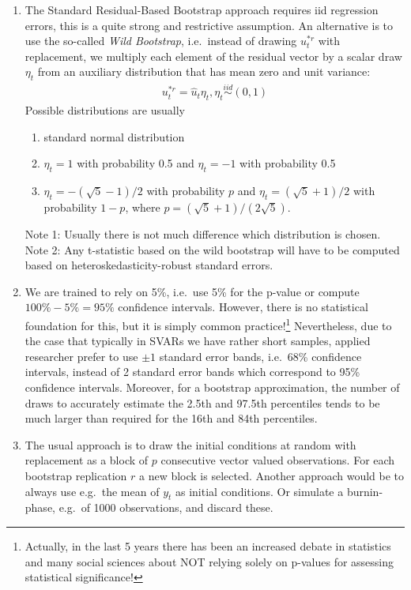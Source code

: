 \begin{enumerate}
\item The Standard Residual-Based Bootstrap approach requires iid regression errors, this is a quite strong and restrictive assumption.
An alternative is to use the so-called \emph{Wild Bootstrap}, i.e.\ instead of drawing \(u_t^{\ast r}\) with replacement,
  we multiply each element of the residual vector by a scalar draw \(\eta_t\) from an auxiliary distribution
that has mean zero and unit variance:
\begin{align*}
u_t^{\ast r} = \hat{u}_t \eta_t, \eta_t \overset{iid}{\sim}(0,1)
\end{align*}
Possible distributions are usually
\begin{enumerate}
  \item standard normal distribution
  \item \(\eta_t =1\) with probability 0.5 and \(\eta_t=-1\) with probability 0.5
  \item \(\eta_t = -(\sqrt{5}-1)/2\) with probability $p$ and \(\eta_t = (\sqrt{5}+1)/2\) with probability \(1-p\),
  where \(p=(\sqrt{5}+1)/(2 \sqrt{5})\).
\end{enumerate}
Note 1: Usually there is not much difference which distribution is chosen.
\\
Note 2: Any t-statistic based on the wild bootstrap will have to be computed based on heteroskedasticity-robust standard errors.

\item We are trained to rely on 5\%, i.e.\ use 5\% for the p-value or compute \(100\%-5\%=95\% \) confidence intervals.
However, there is no statistical foundation for this, but it is simply common practice!\footnote{%
  Actually, in the last 5 years there has been an increased debate in statistics
  and many social sciences about NOT relying solely on p-values for assessing statistical significance!}
Nevertheless, due to the case that typically in SVARs we have rather short samples,
  applied researcher prefer to use \(\pm 1\) standard error bands, i.e.\ 68\% confidence intervals,
  instead of 2 standard error bands which correspond to 95\% confidence intervals.
Moreover, for a bootstrap approximation, the number of draws to accurately estimate the 2.5th and 97.5th percentiles
  tends to be much larger than required for the 16th and 84th percentiles.

\item The usual approach is to draw the initial conditions at random with replacement as a block of \(p\) consecutive vector valued observations.
For each bootstrap replication \(r\) a new block is selected.
Another approach would be to always use e.g.\ the mean of \(y_t\) as initial conditions.
Or simulate a burnin-phase, e.g.\ of 1000 observations, and discard these.


\end{enumerate}
